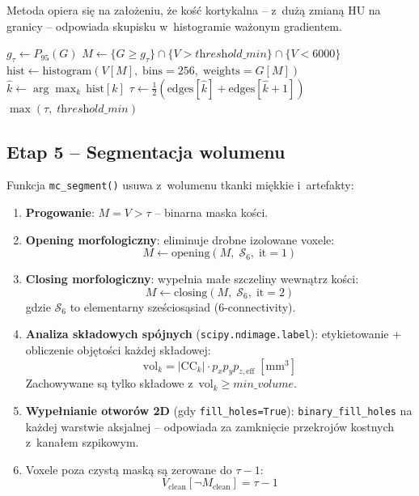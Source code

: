 \documentclass[12pt,a4paper]{article}
\begin{document}
Metoda opiera się na założeniu, że kość kortykalna -- z~dużą zmianą HU na
granicy -- odpowiada skupisku w~histogramie ważonym gradientem.

\begin{algorithm}[H]
\caption{\textsc{EstimateThreshold} -- automatyczne wyznaczenie progu HU}
\label{alg:thr}
\BlankLine
{}
$g_{\tau} \leftarrow P_{95}(G)$\;
$M \leftarrow \{G \geq g_{\tau}\} \cap \{V > \textit{threshold\_min}\} \cap \{V < 6000\}$\;
$\mathrm{hist} \leftarrow \mathrm{histogram}(V[M],\;\mathrm{bins}=256,\;\mathrm{weights}=G[M])$\;
$\hat{k} \leftarrow \arg\max_k\,\mathrm{hist}[k]$\;
$\tau \leftarrow \tfrac{1}{2}(\mathrm{edges}[\hat{k}] + \mathrm{edges}[\hat{k}+1])$\;
\Return $\max(\tau,\;\textit{threshold\_min})$\;
\end{algorithm}

\subsection{Etap 5 -- Segmentacja wolumenu}
\label{sec:seg}

Funkcja \texttt{mc\_segment()} usuwa z~wolumenu tkanki miękkie i~artefakty:

\begin{enumerate}
  \item \textbf{Progowanie}: $M = V > \tau$ -- binarna maska kości.
  \item \textbf{Opening morfologiczny}: eliminuje drobne izolowane voxele:\\
    \[
      M \leftarrow \mathrm{opening}(M,\; \mathcal{S}_{6},\; \text{it}=1)
    \]
  \item \textbf{Closing morfologiczny}: wypełnia małe szczeliny wewnątrz kości:\\
    \[
      M \leftarrow \mathrm{closing}(M,\; \mathcal{S}_{6},\; \text{it}=2)
    \]
    gdzie $\mathcal{S}_6$ to elementarny sześciosąsiad (6-connectivity).
  \item \textbf{Analiza składowych spójnych} (\texttt{scipy.ndimage.label}):
    etykietowanie + obliczenie objętości każdej składowej:
    \[
      \mathrm{vol}_k = |\text{CC}_k| \cdot p_x p_y p_{z,\text{eff}}\;[\text{mm}^3]
    \]
    Zachowywane są tylko składowe z~$\mathrm{vol}_k \geq \textit{min\_volume}$.
  \item \textbf{Wypełnianie otworów 2D} (gdy \texttt{fill\_holes=True}):
    \texttt{binary\_fill\_holes} na każdej warstwie aksjalnej -- odpowiada za
    zamknięcie przekrojów kostnych z~kanałem szpikowym.
  \item Voxele poza czystą maską są zerowane do $\tau - 1$:
    \[
      V_{\text{clean}}[\lnot M_{\text{clean}}] = \tau - 1
    \]
\end{enumerate}
\end{document}
